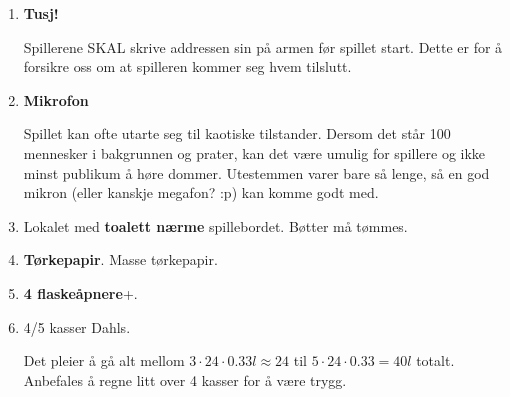 \documentclass[10pt,a4paper,norsk,openany]{book}
\begin{document}
\begin{enumerate}
  \item \textbf{Tusj!}

    Spillerene SKAL skrive addressen sin på armen før spillet start. Dette er for å
    forsikre oss om at spilleren kommer seg hvem tilslutt.

  \item \textbf{Mikrofon}

    Spillet kan ofte utarte seg til kaotiske tilstander. Dersom det står 100
    mennesker i bakgrunnen og prater, kan det være umulig for spillere og ikke minst
    publikum å høre dommer. Utestemmen varer bare så lenge, så en god mikron (eller
    kanskje megafon? :p) kan komme godt med.

  \item Lokalet med \textbf{toalett nærme} spillebordet. Bøtter må tømmes.

  \item \textbf{Tørkepapir}. Masse tørkepapir.

  \item \textbf{4 flaskeåpnere}+.

  \item 4/5 kasser Dahls.

    Det pleier å gå alt mellom $3 \cdot 24 \cdot 0.33l \approx 24 $ til $5 \cdot 24
    \cdot 0.33 = 40l$ totalt. Anbefales å regne litt over 4 kasser for å være trygg.

\end{enumerate}

\begin{figure}
\end{figure}
\end{document}
